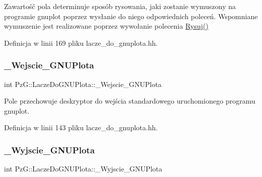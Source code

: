 Zawartość pola determinuje sposób rysowania, jaki zostanie wymuszony na programie {\ttfamily gnuplot} poprzez wysłanie do niego odpowiednich poleceń. Wspomniane wymuszenie jest realizowane poprzez wywołanie polecenia \hyperlink{class_pz_g_1_1_lacze_do_g_n_u_plota_a065f5b8402737cc62b0ad4f66d028335}{Rysuj()} 

Definicja w linii 169 pliku lacze\+\_\+do\+\_\+gnuplota.\+hh.

\mbox{\label{class_pz_g_1_1_lacze_do_g_n_u_plota_adc3a2250216c2473a61da379da70b2d7}} 
\subsubsection{\texorpdfstring{\+\_\+\+Wejscie\+\_\+\+G\+N\+U\+Plota}{\_Wejscie\_GNUPlota}}
{\footnotesize\ttfamily int Pz\+G\+::\+Lacze\+Do\+G\+N\+U\+Plota\+::\+\_\+\+Wejscie\+\_\+\+G\+N\+U\+Plota\hspace{0.3cm}{\ttfamily [protected]}}

Pole przechowuje deskryptor do wejścia standardowego uruchomionego programu gnuplot. 

Definicja w linii 143 pliku lacze\+\_\+do\+\_\+gnuplota.\+hh.

\mbox{\label{class_pz_g_1_1_lacze_do_g_n_u_plota_a7d05a4767a35ee494d59724bb740dbc2}} 
\subsubsection{\texorpdfstring{\+\_\+\+Wyjscie\+\_\+\+G\+N\+U\+Plota}{\_Wyjscie\_GNUPlota}}
{\footnotesize\ttfamily int Pz\+G\+::\+Lacze\+Do\+G\+N\+U\+Plota\+::\+\_\+\+Wyjscie\+\_\+\+G\+N\+U\+Plota\hspace{0.3cm}{\ttfamily [protected]}}

